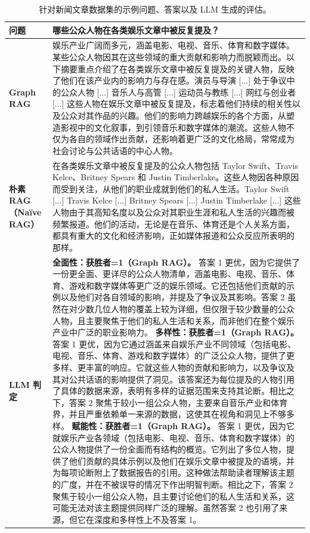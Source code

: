 \documentclass[11pt,UTF8,fontset=fandol]{ctexart}
\begin{document}
\begin{table}[H]\centering
\caption{针对新闻文章数据集的示例问题、答案以及 LLM 生成的评估。}
\label{tab:5}
\small
\renewcommand{\arraystretch}{1.2}
\begin{tabular}{@{}p{1.7cm}p{13cm}@{}}
\toprule
\textbf{问题} & 哪些公众人物在各类娱乐文章中被反复提及？ \\
\midrule
\textbf{Graph RAG} & 娱乐产业广阔而多元，涵盖电影、电视、音乐、体育和数字媒体。某些公众人物因其在这些领域的重大贡献和影响力而脱颖而出。以下摘要重点介绍了在各类娱乐文章中被反复提及的关键人物，反映了他们在该产业内的影响力与存在感。演员与导演 [...] 处于争议中的公众人物 [...] 音乐人与高管 [...] 运动员与教练 [...] 网红与创业者 [...] 这些人物在娱乐文章中被反复提及，标志着他们持续的相关性以及公众对其作品的兴趣。他们的影响力跨越娱乐的各个方面，从塑造影视中的文化叙事，到引领音乐和数字媒体的潮流。这些人物不仅为各自的领域作出贡献，还影响着更广泛的文化格局，常常成为社会讨论与公共话语的中心人物。 \\
\midrule
\textbf{朴素 RAG（Na\"ive RAG）} & 在各类娱乐文章中被反复提及的公众人物包括 Taylor Swift、Travis Kelce、Britney Spears 和 Justin Timberlake。这些人物因各种原因而受到关注，从他们的职业成就到他们的私人生活。Taylor Swift [...] Travis Kelce [...] Britney Spears [...] Justin Timberlake [...] 这些人物由于其高知名度以及公众对其职业生涯和私人生活的兴趣而被频繁报道。他们的活动，无论是在音乐、体育还是个人关系方面，都具有重大的文化和经济影响，正如媒体报道和公众反应所表明的那样。 \\
\midrule
\textbf{LLM 判定} & \textbf{全面性：获胜者=1（Graph RAG）。} 答案 1 更优，因为它提供了一份更全面、更详尽的公众人物清单，涵盖电影、电视、音乐、体育、游戏和数字媒体等更广泛的娱乐领域。它还包括他们贡献的示例以及他们对各自领域的影响，并提及了争议及其影响。答案 2 虽然在对少数几位人物的覆盖上较为详细，但仅限于较少数量的公众人物，且主要聚焦于他们的私人生活和关系，而非他们在整个娱乐产业中广泛的职业影响力。\newline
\textbf{多样性：获胜者=1（Graph RAG）。} 答案 1 更优，因为它通过涵盖来自娱乐产业不同领域（包括电影、电视、音乐、体育、游戏和数字媒体）的广泛公众人物，提供了更多样、更丰富的响应。它就这些人物的贡献和影响力，以及争议及其对公共话语的影响提供了洞见。该答案还为每位提及的人物引用了具体的数据来源，表明有多样的证据范围来支持其论断。相比之下，答案 2 聚焦于较小一组公众人物，主要来自音乐产业和体育界，并且严重依赖单一来源的数据，这使其在视角和洞见上不够多样。\newline
\textbf{赋能性：获胜者=1（Graph RAG）。} 答案 1 更优，因为它就娱乐产业各领域（包括电影、电视、音乐、体育和数字媒体）的公众人物提供了一份全面而有结构的概览。它列出了多位人物，提供了他们贡献的具体示例以及他们在娱乐文章中被提及的语境，并为每项论断附上了数据报告的引用。这种做法帮助读者理解该主题的广度，并在不被误导的情况下作出明智判断。相比之下，答案 2 聚焦于较小一组公众人物，且主要讨论他们的私人生活和关系，这可能无法对该主题提供同样广泛的理解。虽然答案 2 也引用了来源，但它在深度和多样性上不及答案 1。\newline

\end{tabular}
\end{table}
\end{document}
